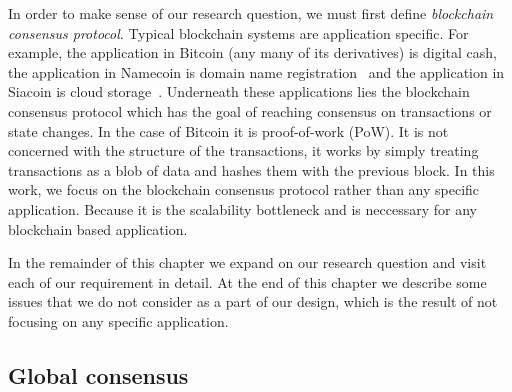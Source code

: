 In order to make sense of our research question, we must first define \emph{blockchain consensus protocol}.
Typical blockchain systems are application specific.
For example, the application in Bitcoin (any many of its derivatives) is digital cash, the application in Namecoin is domain name registration~\cite{namecoin} and the application in Siacoin is cloud storage~\cite{siacoin}.
Underneath these applications lies the blockchain consensus protocol which has the goal of reaching consensus on transactions or state changes.
In the case of Bitcoin it is proof-of-work (PoW).
It is not concerned with the structure of the transactions,
it works by simply treating transactions as a blob of data and hashes them with the previous block.
In this work, we focus on the blockchain consensus protocol rather than any specific application.
Because it is the scalability bottleneck and is neccessary for any blockchain based application.

In the remainder of this chapter we expand on our research question and visit each of our requirement in detail.
At the end of this chapter we describe some issues that we do not consider as a part of our design,
which is the result of not focusing on any specific application.

\subsection{Global consensus}


